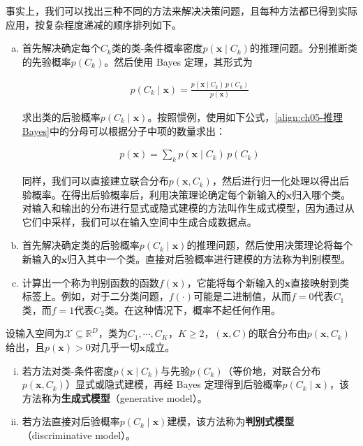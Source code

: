 \documentclass[../../main.tex]{subfiles}
\begin{document}
事实上，我们可以找出三种不同的方法来解决决策问题，且每种方法都已得到实际应用，按复杂程度递减的顺序排列如下。

\begin{enumerate}[(a)]
  \item 首先解决确定每个$C_k$类的类-条件概率密度$p(\boldsymbol{x}\mid C_k)$的推理问题。分别推断类的先验概率$p(C_k)$。然后使用 Bayes 定理，其形式为

  \begin{align}
    p(C_k\mid\boldsymbol{x})=\frac{p(\boldsymbol{x}\mid C_k)\,p(C_k)}{p(\boldsymbol{x})}
    \label{align:ch05-推理Bayes}
  \end{align}

  求出类的后验概率$p(C_k\mid\boldsymbol{x})$。按照惯例，使用如下公式，\eqref{align:ch05-推理Bayes}中的分母可以根据分子中项的数量求出：

  \begin{align}
    p(\boldsymbol{x})=\sum_{k}p(\boldsymbol{x}\mid C_k)\,p(C_k)
    \label{align:ch05-推理分母}
  \end{align}

  同样，我们可以直接建立联合分布$p(\boldsymbol{x},C_k)$，然后进行归一化处理以得出后验概率。在得出后验概率后，利用决策理论确定每个新输入的$\boldsymbol{x}$归入哪个类。对输入和输出的分布进行显式或隐式建模的方法叫作生成式模型，因为通过从它们中采样，我们可以在输入空间中生成合成数据点。

  \item 首先解决确定类的后验概率$p(C_k\mid\boldsymbol{x})$的推理问题，然后使用决策理论将每个新输入的$\boldsymbol{x}$归入其中一个类。直接对后验概率进行建模的方法称为判别模型。

  \item 计算出一个称为判别函数的函数$f(\boldsymbol{x})$，它能将每个新输入的$\boldsymbol{x}$直接映射到类标签上。例如，对于二分类问题，$f(\cdot)$可能是二进制值，从而$f=0$代表$C_1$类，而$f=1$代表$C_2$类。在这种情况下，概率不起任何作用。
\end{enumerate}

\begin{definition}[生成式模型与判别式模型]\label{definition:ch05-生成与判别模型}
设输入空间为$\mathcal{X}\subseteq\mathbb{R}^{D}$，类为$C_1,\cdots,C_K$，$K\geqslant2$，$(\boldsymbol{x},C)$的联合分布由$p(\boldsymbol{x},C_k)$给出，且$p(\boldsymbol{x})>0$对几乎一切$\boldsymbol{x}$成立。
\begin{enumerate}[(i)]
  \item 若方法对类-条件密度$p(\boldsymbol{x}\mid C_k)$与先验$p(C_k)$（等价地，对联合分布$p(\boldsymbol{x},C_k)$）显式或隐式建模，再经 Bayes 定理得到后验概率$p(C_k\mid\boldsymbol{x})$，该方法称为\textbf{生成式模型}（generative model）。
  \item 若方法直接对后验概率$p(C_k\mid\boldsymbol{x})$建模，该方法称为\textbf{判别式模型}（discriminative model）。
\end{enumerate}
\end{definition}
\end{document}
